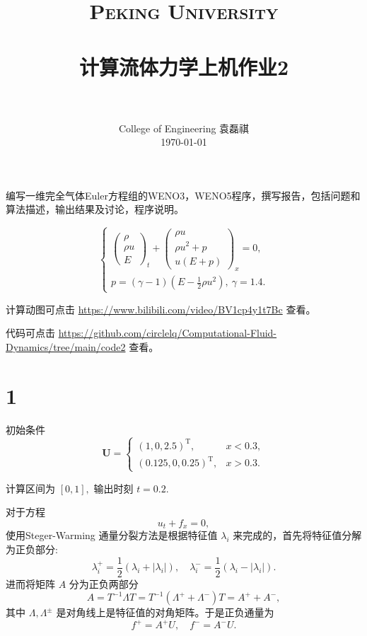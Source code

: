 \documentclass[12pt]{article}
\title{
		\vspace{-1in} 	
		\usefont{OT1}{bch}{b}{n}
		\normalfont \normalsize \textsc{\LARGE Peking University}\\[0.2cm] %
		\horrule{0.5pt} \\[0.2cm]
		\huge \bfseries{计算流体力学上机作业2} \\[-0.2cm]
		\horrule{2pt} \\[0.2cm]
}
\author{
		\normalfont 								\normalsize
		College of Engineering \quad 2001111690  \quad 袁磊祺\\	\normalsize
        \today
}
\date{}
\begin{document}


\maketitle


编写一维完全气体Euler方程组的WENO3，WENO5程序，撰写报告，包括问题和算法描述，输出结果及讨论，程序说明。


\begin{equation}
	\left\{\begin{array}{c}
		\left(\begin{array}{c}
			\rho   \\
			\rho u \\
			E
		\end{array}\right)_{t}+\left(\begin{array}{c}
				\rho u       \\
				\rho u^{2}+p \\
				u(E+p)
			\end{array}\right)_x=0, \\
		p=(\gamma-1)\left(E-\frac{1}{2} \rho u^{2}\right),\ \gamma=1.4.
	\end{array}\right.
\end{equation}

计算动图可点击 \href{https://www.bilibili.com/video/BV1cp4y1t7Bc}{https://www.bilibili.com/video/BV1cp4y1t7Bc} 查看。

代码可点击 \href{https://github.com/circlelq/Computational-Fluid-Dynamics/tree/main/code2}{https://github.com/circlelq/Computational-Fluid-Dynamics/tree/main/code2} 查看。


\section{1}

初始条件
\begin{equation}
	\boldsymbol{U}=\left\{\begin{array}{ll}
		(1,0,2.5)^{\mathrm{T}},      & x<0.3, \\
		(0.125,0,0.25)^{\mathrm{T}}, & x>0.3.
	\end{array}\right.
\end{equation}

计算区间为 $[0,1],$ 输出时刻 $t=0.2 .$

对于方程
\begin{equation}
	u_t + f_x = 0,
\end{equation}
使用Steger-Warming 通量分裂方法是根据特征值 $\lambda_{i}$ 来完成的，首先将特征值分解为正负部分:
\begin{equation}
	\lambda_{i}^{+}=\frac{1}{2}\left(\lambda_{i}+\left|\lambda_{i}\right|\right), \quad \lambda_{i}^{-}=\frac{1}{2}\left(\lambda_{i}-\left|\lambda_{i}\right|\right) .
\end{equation}
进而将矩阵 $A$ 分为正负两部分
\begin{equation}
	A=T^{-1} \Lambda T=T^{-1}\left(\Lambda^{+}+\Lambda^{-}\right) T=A^{+}+A^{-},
\end{equation}
其中 $\Lambda, \Lambda^{\pm}$ 是对角线上是特征值的对角矩阵。于是正负通量为
\begin{equation}
	f^{+}=A^{+} U, \quad f^{-}=A^{-} U.
\end{equation}
\end{document}
